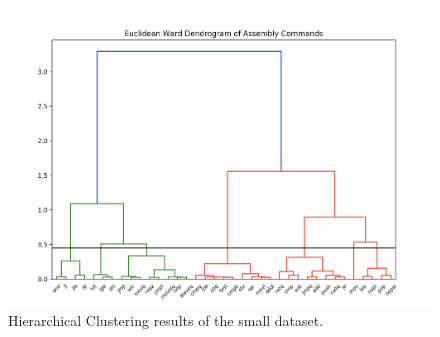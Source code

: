 \begin{figure}
  \includegraphics[width=\linewidth]{./figures/clust_small.png}
  \caption{Hierarchical Clustering results of the small dataset.}
  \label{fig:clust}
\end{figure}